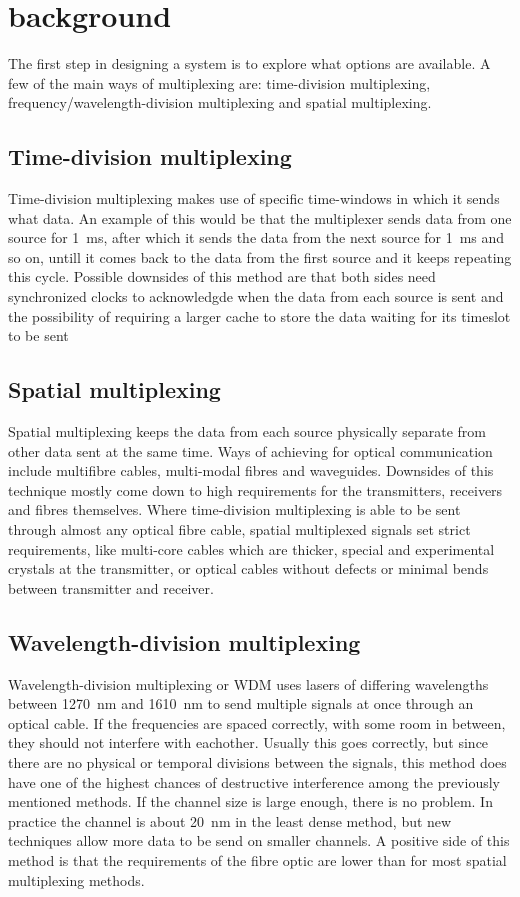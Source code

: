 \section{background}
\label{sec:background}

The first step in designing a system is to explore what options 
are available. A few of the main ways of multiplexing are: time-division multiplexing, 
frequency/wavelength-division multiplexing and spatial multiplexing.

\subsection{Time-division multiplexing}
Time-division multiplexing makes use of specific time-windows in which it sends what data.
An example of this would be that the multiplexer sends data from one source for \qty{1}{\ms}, 
after which it sends the data from the next source for \qty{1}{\ms} and so on, untill it comes 
back to the data from the first source and it keeps repeating this cycle. Possible downsides of
this method are that both sides need synchronized clocks to acknowledgde when the data from 
each source is sent and the possibility of requiring a larger cache to store the data waiting 
for its timeslot to be sent

\subsection{Spatial multiplexing}
Spatial multiplexing keeps the data from each source physically separate from other data sent 
at the same time. Ways of achieving for optical communication include multifibre cables, 
multi-modal fibres and waveguides. Downsides of this technique mostly come down to high requirements 
for the transmitters, receivers and fibres themselves. Where time-division multiplexing is able to be 
sent through almost any optical fibre cable, spatial multiplexed signals set strict requirements, like 
multi-core cables which are thicker, special and experimental crystals at the transmitter, or optical cables 
without defects or minimal bends between transmitter and receiver.

\subsection{Wavelength-division multiplexing}
Wavelength-division multiplexing or WDM uses lasers of differing wavelengths between \qty{1270}{\nm} and 
\qty{1610}{\nm} to send multiple signals at once through an optical cable. If the frequencies are spaced 
correctly, with some room in between, they should not interfere with eachother. Usually this goes correctly, 
but since there are no physical or temporal divisions between the signals, this method does have one of the highest
chances of destructive interference among the previously mentioned methods. If the channel size is large 
enough, there is no problem. In practice the channel is about \qty{20}{\nm} in the least dense method, but new techniques 
allow more data to be send on smaller channels. A positive side of this method is that the requirements of the 
fibre optic are lower than for most spatial multiplexing methods.

